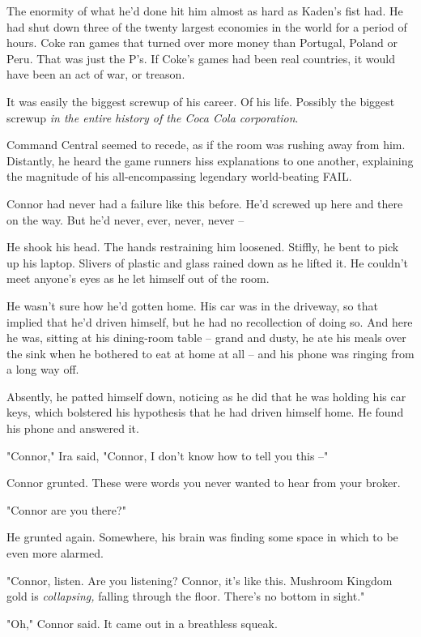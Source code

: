 The enormity of what he'd done hit him almost as hard as Kaden's
fist had. He had shut down three of the twenty largest economies in
the world for a period of hours. Coke ran games that turned over
more money than Portugal, Poland or Peru. That was just the P's. If
Coke's games had been real countries, it would have been an act of
war, or treason.

It was easily the biggest screwup of his career. Of his life.
Possibly the biggest screwup
\emph{in the entire history of the Coca Cola corporation}.

Command Central seemed to recede, as if the room was rushing away
from him. Distantly, he heard the game runners hiss explanations to
one another, explaining the magnitude of his all-encompassing
legendary world-beating FAIL.

Connor had never had a failure like this before. He'd screwed up
here and there on the way. But he'd never, ever, never, never --

He shook his head. The hands restraining him loosened. Stiffly, he
bent to pick up his laptop. Slivers of plastic and glass rained
down as he lifted it. He couldn't meet anyone's eyes as he let
himself out of the room.

He wasn't sure how he'd gotten home. His car was in the driveway,
so that implied that he'd driven himself, but he had no
recollection of doing so. And here he was, sitting at his
dining-room table -- grand and dusty, he ate his meals over the
sink when he bothered to eat at home at all -- and his phone was
ringing from a long way off.

Absently, he patted himself down, noticing as he did that he was
holding his car keys, which bolstered his hypothesis that he had
driven himself home. He found his phone and answered it.

"Connor," Ira said, "Connor, I don't know how to tell you this --"

Connor grunted. These were words you never wanted to hear from your
broker.

"Connor are you there?"

He grunted again. Somewhere, his brain was finding some space in
which to be even more alarmed.

"Connor, listen. Are you listening? Connor, it's like this.
Mushroom Kingdom gold is \emph{collapsing,} falling through the
floor. There's no bottom in sight."

"Oh," Connor said. It came out in a breathless squeak.

